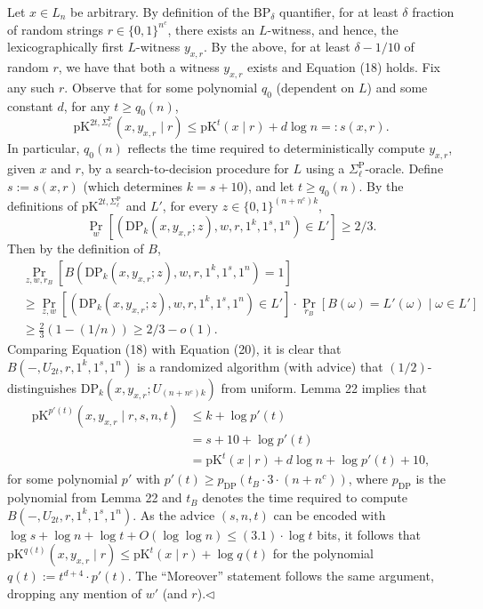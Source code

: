 Let $x\in L_n$ be arbitrary. By definition of the $\mathrm{BP}_\delta$ quantifier, for at least $\delta$ fraction of random strings $r\in\{0,1\}^{n^c}$, there exists an $L$-witness, and hence, the lexicographically first $L$-witness $y_{x,r}$. By the above, for at least $\delta-1/10$ of random $r$, we have that both a witness $y_{x,r}$ exists and Equation (18) holds. Fix any such $r$.
Observe that for some polynomial $q_0$ (dependent on $L$) and some constant $d$, for any $t\geq q_0(n)$,
\[\mathrm{pK}^{2t,\Sigma_\ell^{\mathrm P}}(x,y_{x,r}\mid r)\leq\mathrm{pK}^t(x\mid r)+d\log n=:s(x,r).\tag{19}\]
In particular, $q_0(n)$ reflects the time required to deterministically compute $y_{x,r}$, given $x$ and $r$, by a search-to-decision procedure for $L$ using a $\Sigma_\ell^{\mathrm P}$-oracle.
Define $s:=s(x,r)$ (which determines $k=s+10$), and let $t\geq q_0(n)$. By the definitions of $\mathrm{pK}^{2t,\Sigma_\ell^{\mathrm P}}$ and $L'$, for every $z\in\{0,1\}^{(n+n^c)k}$,
\[\Pr_w[(\mathrm{DP}_k(x,y_{x,r};z),w,r,1^k,1^s,1^n)\in L']\geq2/3.\]
Then by the definition of $B$,
\begin{align*}
&\Pr_{z,w,r_B}[B(\mathrm{DP}_k(x,y_{x,r};z),w,r,1^k,1^s,1^n)=1]\\
&\geq\Pr_{z,w}[(\mathrm{DP}_k(x,y_{x,r};z),w,r,1^k,1^s,1^n)\in L']\cdot\Pr_{r_B}[B(\omega)=L'(\omega)\mid\omega\in L']\\
&\geq\frac23(1-(1/n))\geq2/3-o(1).\tag{20}
\end{align*}
Comparing Equation (18) with Equation (20), it is clear that $B(-,U_{2t},r,1^k,1^s,1^n)$ is a randomized algorithm (with advice) that $(1/2)$-distinguishes $\mathrm{DP}_k(x,y_{x,r};U_{(n+n^c)k})$ from uniform. Lemma 22 implies that
\begin{align*}
\mathrm{pK}^{p'(t)}(x,y_{x,r}\mid r,s,n,t)&\leq k+\log p'(t)\tag{21}\\
&=s+10+\log p'(t)\\
&=\mathrm{pK}^t(x\mid r)+d\log n+\log p'(t)+10,
\end{align*}
for some polynomial $p'$ with $p'(t)\geq p_{\mathrm{DP}}(t_B\cdot3\cdot(n+n^c))$, where $p_{\mathrm{DP}}$ is the polynomial from Lemma 22 and $t_B$ denotes the time required to compute $B(-,U_{2t},r,1^k,1^s,1^n)$. As the advice $(s,n,t)$ can be encoded with $\log s+\log n+\log t+O(\log\log n)\leq(3.1)\cdot\log t$ bits, it follows that $\mathrm{pK}^{q(t)}(x,y_{x,r}\mid r)\leq\mathrm{pK}^t(x\mid r)+\log q(t)$ for the polynomial $q(t):=t^{d+4}\cdot p'(t)$.
The ``Moreover'' statement follows the same argument, dropping any mention of $w'$ (and $r$).\hfill$\triangleleft$
